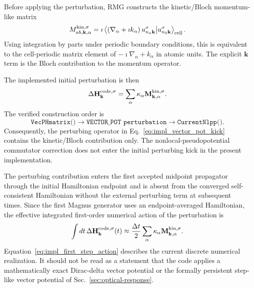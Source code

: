 Before applying the perturbation, RMG constructs the kinetic/Bloch
momentum-like matrix
\begin{equation}
  M_{ab,\mathbf k,\alpha}^{\rm kin,\sigma}
  =
  \imath
  \left\langle
    \left(\nabla_\alpha+\imath k_\alpha\right)
    u_{n_a\mathbf k}^{\sigma}
    \middle|
    u_{n_b\mathbf k}^{\sigma}
  \right\rangle_{\rm cell}.
  \label{eq:impl_mkin}
\end{equation}
Using integration by parts under periodic boundary conditions, this is
equivalent to the cell-periodic matrix element of
$-\imath\nabla_\alpha+k_\alpha$ in atomic units.  The explicit
$\mathbf k$ term is the Bloch contribution to the momentum operator.

The implemented initial perturbation is then
\begin{equation}
  \Delta\mathbf H_{\mathbf k}^{\rm code,\sigma}
  =
  \sum_\alpha
  \kappa_\alpha
  \mathbf M_{\mathbf k,\alpha}^{\rm kin,\sigma}.
  \label{eq:impl_vector_pot_kick}
\end{equation}
The verified construction order is
\[
  \texttt{VecPHmatrix()}
  \rightarrow
  \texttt{VECTOR\_POT\ perturbation}
  \rightarrow
  \texttt{CurrentNlpp()} .
\]
Consequently, the perturbing operator in
Eq.~\eqref{eq:impl_vector_pot_kick} contains the kinetic/Bloch
contribution only.  The nonlocal-pseudopotential commutator correction
does not enter the initial perturbing kick in the present
implementation.

The perturbing contribution enters the first accepted midpoint
propagator through the initial Hamiltonian endpoint and is absent from
the converged self-consistent Hamiltonian without the external
perturbing term at subsequent times.  Since the first Magnus generator
uses an endpoint-averaged Hamiltonian, the effective integrated
first-order numerical action of the perturbation is
\begin{equation}
  \int dt\,
  \Delta\mathbf H_{\mathbf k}^{\rm code,\sigma}(t)
  \approx
  \frac{\Delta t}{2}
  \sum_\alpha
  \kappa_\alpha
  \mathbf M_{\mathbf k,\alpha}^{\rm kin,\sigma}.
  \label{eq:impl_first_step_action}
\end{equation}
Equation~\eqref{eq:impl_first_step_action} describes the current
discrete numerical realization.  It should not be read as a statement
that the code applies a mathematically exact Dirac-delta vector
potential or the formally persistent step-like vector potential of
Sec.~\ref{sec:optical-response}.

